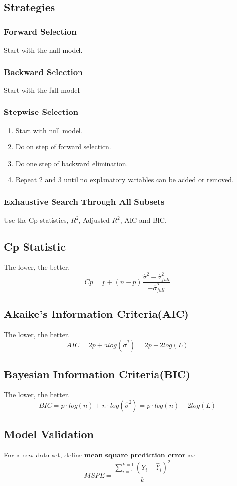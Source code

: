 \documentclass[10pt,landscape, fleqn]{article}
\begin{document}
\begin{multicols}{3}
			\subsection{Strategies}
				\subsubsection{Forward Selection}
					Start with the null model.
				\subsubsection{Backward Selection}
					Start with the full model.
				\subsubsection{Stepwise Selection}
					\begin{enumerate}
						\item Start with null model.
						\item Do on step of forward selection.
						\item Do one step of backward elimination.
						\item Repeat 2 and 3 until no explanatory variables can be added or removed.
					\end{enumerate}
				\subsubsection{Exhaustive Search Through All Subsets}
					Use the Cp statistics, $R^2$, Adjusted $R^2$, AIC and BIC.
			\subsection{Cp Statistic}
				The lower, the better.
				\[ Cp = p + (n-p)\frac{\hat{\sigma}^2 - \hat{\sigma}^2_{full}}{- \hat{\sigma}^2_{full}}\]
			\subsection{Akaike's Information Criteria(AIC)}
				The lower, the better.
				\[ AIC = 2p + n log(\hat{\sigma}^2) = 2p - 2log(L) \]
			\subsection{Bayesian Information Criteria(BIC)}
				The lower, the better.
				\[ BIC = p\cdot log(n) + n\cdot log(\hat{\sigma}^2) = p\cdot log(n) - 2log(L) \]
			\subsection{Model Validation}
				For a new data set, define \textbf{mean square prediction error} as:
				\[ MSPE = \frac{\sum_{i=1}^{k=1}(Y_i-\hat{Y}_i)^2}{k} \]

\end{multicols}
\end{document}
